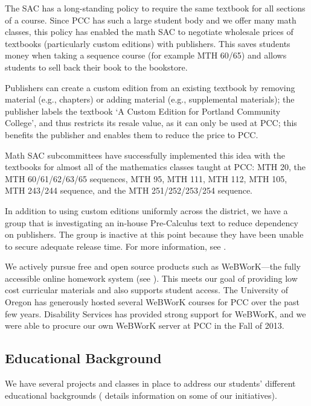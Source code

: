 The SAC has a long-standing policy to require the same textbook for all
sections of a course. Since PCC has such a large student body and we offer many
math classes, this policy has enabled the math SAC to negotiate wholesale
prices of textbooks (particularly custom editions) with publishers.  This saves
students money when taking a sequence course (for example MTH 60/65) and allows
students to sell back their book to the bookstore.

Publishers can create a custom edition from an existing textbook by removing
material (e.g., chapters) or adding material (e.g., supplemental materials);
the publisher labels the textbook `A Custom Edition for Portland Community
College', and thus restricts its resale value, as it can only be used at PCC;
this benefits the publisher and enables them to reduce the price to PCC.  

Math SAC subcommittees have successfully implemented this idea with the
textbooks for almost all of the mathematics classes taught at PCC: MTH 20, the
MTH 60/61/62/63/65 sequences, MTH 95, MTH 111, MTH 112, MTH 105, MTH 243/244
sequence, and the MTH 251/252/253/254 sequence.

In addition to using custom editions uniformly across the district, we have a
group that is investigating an in-house Pre-Calculus text to reduce dependency
on publishers. The group is inactive at this point because they have been
unable to secure adequate release time. For more information, see
.

We actively pursue free and open source products such as WeBWorK---the fully
accessible online homework system (see ). This
meets our goal of providing low cost curricular materials and also supports
student access. The University of Oregon has generously hosted several WeBWorK
courses for PCC over the past few years.  Disability Services has provided
strong support for WeBWorK, and we were able to procure our own WeBWorK server
at PCC in the Fall of 2013.

\subsection{Educational Background}
We have several projects and classes in place to address our students'
different educational backgrounds ( details information on
some of our initiatives).

